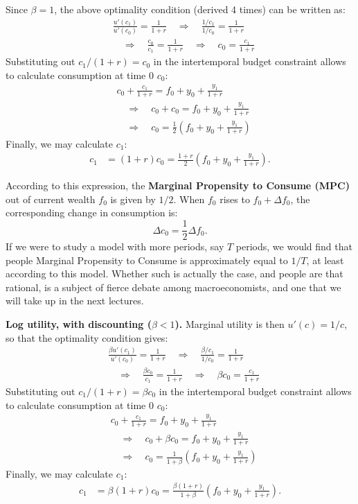 \documentclass[]{book}
\theoremstyle{definition}
\theoremstyle{definition}
\theoremstyle{definition}
\theoremstyle{remark}
\begin{document}
Since \(\beta=1\), the above optimality condition (derived 4 times) can
be written as: \[
\begin{aligned}
& \frac{u'(c_{1})}{u'(c_{0})}=\frac{1}{1+r} \quad \Rightarrow \quad \frac{1/c_1}{1/c_0}=\frac{1}{1+r} \\
& \quad \Rightarrow \quad \frac{c_0}{c_1}=\frac{1}{1+r} \quad \Rightarrow \quad c_{0}=\frac{c_{1}}{1+r}
\end{aligned}
\] Substituting out \(c_{1}/(1+r)=c_0\) in the intertemporal budget
constraint allows to calculate consumption at time \(0\) \(c_0\): \[
\begin{aligned}
&c_{0}+\frac{c_{1}}{1+r}=f_{0}+y_{0}+\frac{y_{1}}{1+r}\\
&\quad \Rightarrow \quad c_{0}+c_0=f_{0}+y_{0}+\frac{y_{1}}{1+r}\\
&\quad \Rightarrow \quad c_{0}=\frac{1}{2}\left(f_{0}+y_{0}+\frac{y_{1}}{1+r}\right)
\end{aligned}
\] Finally, we may calculate \(c_1\): \[
\begin{aligned}
c_{1}&=(1+r)c_0=\frac{1+r}{2}\left(f_{0}+y_{0}+\frac{y_{1}}{1+r}\right).
\end{aligned}
\]

According to this expression, the \textbf{Marginal Propensity to Consume
(MPC)} out of current wealth \(f_{0}\) is given by \(1/2\). When \(f_0\)
rises to \(f_0+\Delta f_0\), the corresponding change in consumption is:
\[\Delta c_0 = \frac{1}{2}\Delta f_0.\] If we were to study a model with
more periods, say \(T\) periods, we would find that people Marginal
Propensity to Consume is approximately equal to \(1/T\), at least
according to this model. Whether such is actually the case, and people
are that rational, is a subject of fierce debate among macroeconomists,
and one that we will take up in the next lectures.

\textbf{Log utility, with discounting (\(\beta < 1\)).} Marginal utility
is then \(u'(c)=1/c\), so that the optimality condition gives: \[
\begin{aligned}
& \frac{\beta u'(c_{1})}{u'(c_{0})}=\frac{1}{1+r} \quad \Rightarrow \quad \frac{\beta/c_1}{1/c_0}=\frac{1}{1+r} \\
& \quad \Rightarrow \quad \frac{\beta c_0}{c_1}=\frac{1}{1+r} \quad \Rightarrow \quad \beta c_{0}=\frac{c_{1}}{1+r}
\end{aligned}
\] Substituting out \(c_{1}/(1+r)=\beta c_0\) in the intertemporal
budget constraint allows to calculate consumption at time \(0\) \(c_0\):
\[
\begin{aligned}
&c_{0}+\frac{c_{1}}{1+r}=f_{0}+y_{0}+\frac{y_{1}}{1+r}\\
&\quad \Rightarrow \quad c_{0}+\beta c_0=f_{0}+y_{0}+\frac{y_{1}}{1+r}\\
&\quad \Rightarrow \quad c_{0}=\frac{1}{1+\beta}\left(f_{0}+y_{0}+\frac{y_{1}}{1+r}\right)
\end{aligned}
\] Finally, we may calculate \(c_1\): \[
\begin{aligned}
c_{1}&=\beta (1+r)c_0=\frac{\beta(1+r)}{1+\beta}\left(f_{0}+y_{0}+\frac{y_{1}}{1+r}\right).
\end{aligned}
\]
\end{document}
